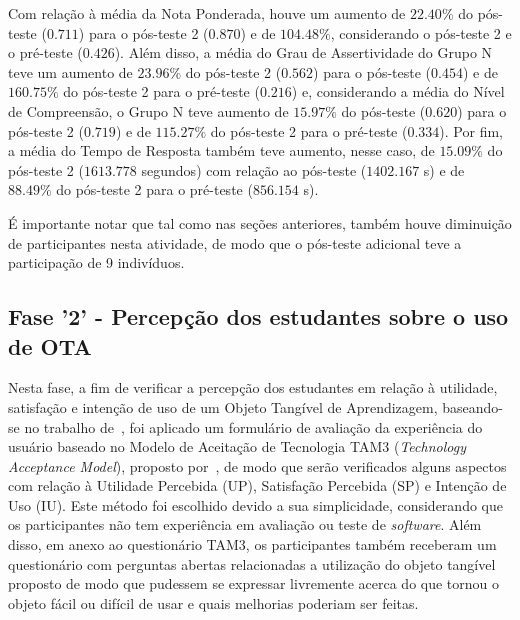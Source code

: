 Com relação à média da Nota Ponderada, houve um aumento de $22.40\%$ do pós-teste ($0.711$) para o pós-teste 2 ($0.870$) e de $104.48\%$, considerando o pós-teste 2 e o pré-teste ($0.426$). Além disso, a média do Grau de Assertividade do Grupo N teve um aumento de $23.96\%$ do pós-teste 2 ($0.562$) para o pós-teste ($0.454$) e de $160.75\%$ do pós-teste 2 para o pré-teste ($0.216$) e, considerando a média do Nível de Compreensão, o Grupo N teve aumento de $15.97\%$ do pós-teste ($0.620$) para o pós-teste 2 ($0.719$) e de $115.27\%$ do pós-teste 2 para o pré-teste ($0.334$). Por fim, a média do Tempo de Resposta também teve aumento, nesse caso, de $15.09\%$ do pós-teste 2 ($1613.778$ segundos) com relação ao pós-teste ($1402.167$ s) e de $88.49\%$ do pós-teste 2 para o pré-teste ($856.154$ s).

É importante notar que tal como nas seções anteriores, também houve diminuição de participantes nesta atividade, de modo que o pós-teste adicional teve a participação de 9 indivíduos.

\subsection{Fase '2' - Percepção dos estudantes sobre o uso de OTA}\label{subsec:fase2}

Nesta fase, a fim de verificar a percepção dos estudantes em relação à utilidade, satisfação e intenção de uso de um Objeto Tangível de Aprendizagem, baseando-se no trabalho de~\cite{marques:2019}, foi aplicado um formulário de avaliação da experiência do usuário baseado no Modelo de Aceitação de Tecnologia TAM3 (\textit{Technology Acceptance Model}), proposto por~\citep{Venkatesh:2008}, de modo que serão verificados alguns aspectos com relação à Utilidade Percebida (UP), Satisfação Percebida (SP) e Intenção de Uso (IU). Este método foi escolhido devido a sua simplicidade, considerando que os participantes não tem experiência em avaliação ou teste de \textit{software}. Além disso, em anexo ao questionário TAM3, os participantes também receberam um questionário com perguntas abertas relacionadas a utilização do objeto tangível proposto de modo que pudessem se expressar livremente acerca do que tornou o objeto fácil ou difícil de usar e quais melhorias poderiam ser feitas.

